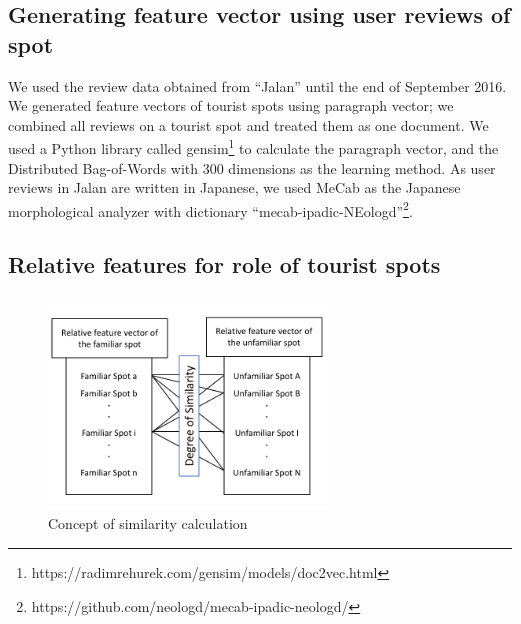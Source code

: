 \documentclass[journal]{IAENGtran}
\begin{document}
\subsection{Generating feature vector using user reviews of spot}
\label{subsec:Generating feature vector using user reviews of spot}
We used the review data obtained from ``Jalan'' until the end of September 2016.
We generated feature vectors of tourist spots using paragraph vector\cite{Codd10}; we combined all reviews on a tourist spot and treated them as one document.
We used a Python library called gensim\footnote{https://radimrehurek.com/gensim/models/doc2vec.html} to calculate the paragraph vector, and the Distributed Bag-of-Words with 300 dimensions as the learning method.
As user reviews in Jalan are written in Japanese, we used MeCab\cite{Codd11} as the Japanese morphological analyzer with dictionary ``mecab-ipadic-NEologd''\footnote{https://github.com/neologd/mecab-ipadic-neologd/}.

\subsection{Relative features for role of tourist spots}
\label{Relative features for role of tourist spots}

\begin{figure}[t]
  \begin{center}
    \includegraphics[clip,width=7.5cm,bb=0 0 720 540]{picture/Photo_CosSim_eng.png}
    \caption{Concept of similarity calculation}
    \label{fig:Photo_CosSim}
  \end{center}
\end{figure}
\end{document}
